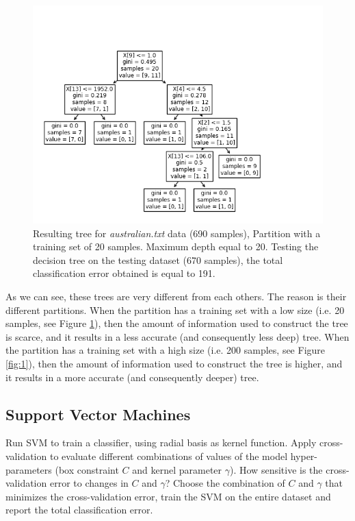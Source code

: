 \documentclass[12pt,letterpaper]{article}
\begin{document}
\begin{figure}[H]
    \centering
    \includegraphics[width=15cm]{images/tree2.jpg}
    \caption{Resulting tree for \textit{australian.txt} data (690 samples), Partition with a training set of 20 samples. Maximum depth equal to 20. Testing the decision tree on  the testing dataset (670 samples), the total classification error obtained is equal to 191.}
    \label{fig:4}
\end{figure}
        
As we can see, these trees are very different from each others. The reason is their different partitions. When the partition has a training set with a low size (i.e. 20 samples, see Figure \ref{fig:4}), then the amount of information used to construct the tree is scarce, and it results in a less accurate (and consequently less deep) tree. When the partition has a training set with a high size (i.e. 200 samples, see Figure \ref{fig:1}), then the amount of information used to construct the tree is higher, and it results in a more accurate (and consequently deeper) tree.

\newpage
\subsection*{Support Vector Machines}
Run SVM to train a classifier, using radial basis as kernel function. Apply cross-validation to evaluate different combinations of values of the model hyper-parameters (box constraint $C$ and kernel parameter $\gamma$). How sensitive is the cross-validation error to changes in $C$ and $\gamma$? Choose the combination of $C$ and $\gamma$ that minimizes the cross-validation error, train the SVM on the entire dataset and report the total classification error.
\end{document}
